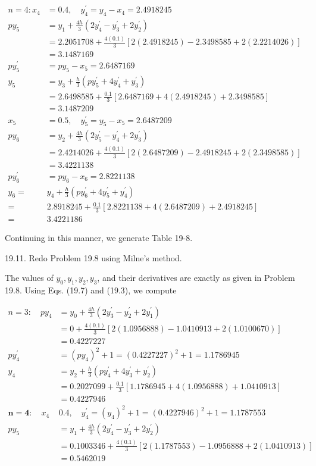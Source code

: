 \documentclass[10pt]{article}
\begin{document}
$$
\begin{aligned}
n=4: x_{4} & =0.4, \quad y_{4}^{\prime}=y_{4}-x_{4}=2.4918245 \\
p y_{5} & =y_{1}+\frac{4 h}{3}\left(2 y_{4}^{\prime}-y_{3}^{\prime}+2 y_{2}^{\prime}\right) \\
& =2.2051708+\frac{4(0.1)}{3}[2(2.4918245)-2.3498585+2(2.2214026)] \\
& =3.1487169 \\
p y_{5}^{\prime} & =p y_{5}-x_{5}=2.6487169 \\
y_{5} & =y_{3}+\frac{h}{3}\left(p y_{5}^{\prime}+4 y_{4}^{\prime}+y_{3}^{\prime}\right) \\
& =2.6498585+\frac{0.1}{3}[2.6487169+4(2.4918245)+2.3498585] \\
& =3.1487209 \\
x_{5} & =0.5, \quad y_{5}^{\prime}=y_{5}-x_{5}=2.6487209 \\
p y_{6} & =y_{2}+\frac{4 h}{3}\left(2 y_{5}^{\prime}-y_{4}^{\prime}+2 y_{3}^{\prime}\right) \\
& =2.4214026+\frac{4(0.1)}{3}[2(2.6487209)-2.4918245+2(2.3498585)] \\
& =3.4221138 \\
p y_{6}^{\prime} & =p y_{6}-x_{6}=2.8221138 \\
y_{6}= & y_{4}+\frac{h}{3}\left(p y_{6}^{\prime}+4 y_{5}^{\prime}+y_{4}^{\prime}\right) \\
= & 2.8918245+\frac{0.1}{3}[2.8221138+4(2.6487209)+2.4918245] \\
= & 3.4221186
\end{aligned}
$$

Continuing in this manner, we generate Table 19-8.

19.11. Redo Problem 19.8 using Milne's method.

The values of $y_{0}, y_{1}, y_{2}, y_{3}$, and their derivatives are exactly as given in Problem 19.8. Using Eqs. (19.7) and (19.3), we compute

$$
\begin{array}{rl}
n=3: \quad p y_{4} & =y_{0}+\frac{4 h}{3}\left(2 y_{3}^{\prime}-y_{2}^{\prime}+2 y_{1}^{\prime}\right) \\
& =0+\frac{4(0.1)}{3}[2(1.0956888)-1.0410913+2(1.0100670)] \\
& =0.4227227 \\
p y_{4}^{\prime} & =\left(p y_{4}\right)^{2}+1=(0.4227227)^{2}+1=1.1786945 \\
y_{4} & =y_{2}+\frac{h}{3}\left(p y_{4}^{\prime}+4 y_{3}^{\prime}+y_{2}^{\prime}\right) \\
& =0.2027099+\frac{0.1}{3}[1.1786945+4(1.0956888)+1.0410913] \\
& =0.4227946 \\
\mathbf{n = 4 :} \quad x_{4} & 0.4, \quad y_{4}^{\prime}=\left(y_{4}\right)^{2}+1=(0.4227946)^{2}+1=1.1787553 \\
p y_{5} & =y_{1}+\frac{4 h}{3}\left(2 y_{4}^{\prime}-y_{3}^{\prime}+2 y_{2}^{\prime}\right) \\
& =0.1003346+\frac{4(0.1)}{3}[2(1.1787553)-1.0956888+2(1.0410913)] \\
& =0.5462019
\end{array}
$$
\end{document}
